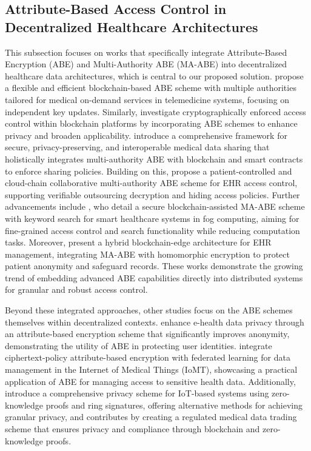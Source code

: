 \documentclass[cic,tc,english]{iiufrgs}
\begin{document}
        \subsection{Attribute-Based Access Control in Decentralized Healthcare Architectures}
            This subsection focuses on works that specifically integrate Attribute-Based Encryption (ABE) and Multi-Authority ABE (MA-ABE) into decentralized healthcare data architectures, which is central to our proposed solution. \citet{Guo2019Flexible} propose a flexible and efficient blockchain-based ABE scheme with multiple authorities tailored for medical on-demand services in telemedicine systems, focusing on independent key updates. Similarly, \citet{Ghaffaripour2019Cryptographically} investigate cryptographically enforced access control within blockchain platforms by incorporating ABE schemes to enhance privacy and broaden applicability. \citet{Jin2019Secure} introduce a comprehensive framework for secure, privacy-preserving, and interoperable medical data sharing that holistically integrates multi-authority ABE with blockchain and smart contracts to enforce sharing policies. Building on this, \citet{Yang2022Blockchain} propose a patient-controlled and cloud-chain collaborative multi-authority ABE scheme for EHR access control, supporting verifiable outsourcing decryption and hiding access policies. Further advancements include \citet{Li2023Secure}, who detail a secure blockchain-assisted MA-ABE scheme with keyword search for smart healthcare systems in fog computing, aiming for fine-grained access control and search functionality while reducing computation tasks. Moreover, \citet{Guo2023Hybrid} present a hybrid blockchain-edge architecture for EHR management, integrating MA-ABE with homomorphic encryption to protect patient anonymity and safeguard records. These works demonstrate the growing trend of embedding advanced ABE capabilities directly into distributed systems for granular and robust access control.

            Beyond these integrated approaches, other studies focus on the ABE schemes themselves within decentralized contexts. \citet{Zala2024} enhance e-health data privacy through an attribute-based encryption scheme that significantly improves anonymity, demonstrating the utility of ABE in protecting user identities. \citet{Bhansali2022} integrate ciphertext-policy attribute-based encryption with federated learning for data management in the Internet of Medical Things (IoMT), showcasing a practical application of ABE for managing access to sensitive health data. Additionally, \citet{Esfahani2024} introduce a comprehensive privacy scheme for IoT-based systems using zero-knowledge proofs and ring signatures, offering alternative methods for achieving granular privacy, and \citet{Li2024} contributes by creating a regulated medical data trading scheme that ensures privacy and compliance through blockchain and zero-knowledge proofs.
\end{document}
